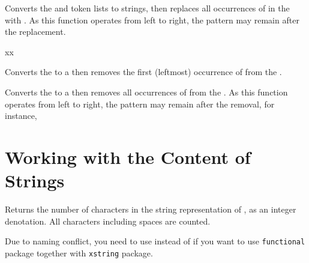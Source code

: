 \documentclass[oneside]{book}
\begin{document}
\begin{function}{\StrVarReplaceAll}
\begin{syntax}
   
\end{syntax}
Converts the  and  token lists to strings, then
replaces all occurrences of  in the
 with .
As this function
operates from left to right, the pattern 
may remain after the replacement.
\begin{demohigh}
\StrSet {}
\StrVarReplaceAll {} {xx}
\StrUse \lTmpaStr
\end{demohigh}
\end{function}

\begin{function}{\StrVarRemoveOnce}
\begin{syntax}
  
\end{syntax}
Converts the  to a  then
removes the first (leftmost) occurrence of  from the .
\begin{demohigh}
\StrSet {}
\StrVarRemoveOnce {}
\StrUse \lTmpaStr
\end{demohigh}
\end{function}

\begin{function}{\StrVarRemoveAll}
\begin{syntax}
  
\end{syntax}
Converts the  to a  then
removes all occurrences of  from the .
As this function operates from left to right,
the pattern  may remain after the removal, for instance,
\begin{demohigh}
\StrSet {}
\StrVarRemoveAll {}
\TlUse \lTmpaStr
\end{demohigh}
\end{function}

\section{Working with the Content of Strings}

\begin{function}{\StrCount}
\begin{syntax}
 
\end{syntax}
Returns the number of characters in the string representation of ,
as an integer denotation. All characters including spaces are counted.
\begin{demohigh}
\end{demohigh}
Due to naming conflict, you need to use  instead of 
if you want to use \verb!functional! package together with \verb!xstring! package.
\end{function}
\end{document}
